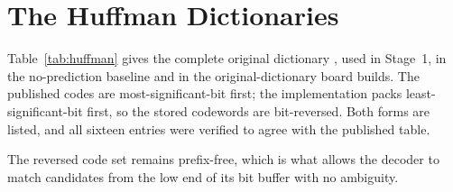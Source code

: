 \chapter{The Huffman Dictionaries}
\label{app:huffman}

Table~\ref{tab:huffman} gives the complete original dictionary
\cite[Table~A.1]{kiem2025}, used in Stage~1, in the no-prediction baseline and
in the original-dictionary board builds. The published codes are most-significant-bit first; the
implementation packs least-significant-bit first, so the stored codewords are
bit-reversed. Both forms are listed, and all sixteen entries were verified to
agree with the published table.

The reversed code set remains prefix-free, which is what allows the decoder to
match candidates from the low end of its bit buffer with no ambiguity.

